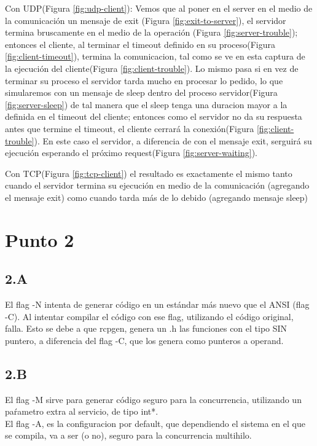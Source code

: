 \documentclass[12pt,journal,compsoc]{IEEEtran}
\begin{document}
Con UDP(Figura \ref{fig:udp-client}):
Vemos que al poner en el server en el medio de la comunicación un mensaje de exit (Figura \ref{fig:exit-to-server}), el servidor termina bruscamente en el medio de la operación (Figura \ref{fig:server-trouble}); entonces el cliente, al terminar el timeout definido en su proceso(Figura \ref{fig:client-timeout}), termina la comunicacion, tal como se ve en esta captura de la ejecución del cliente(Figura \ref{fig:client-trouble}).
Lo mismo pasa si en vez de terminar su proceso el servidor tarda mucho en procesar lo pedido, lo que simularemos con un mensaje de sleep dentro del proceso servidor(Figura \ref{fig:server-sleep}) de tal manera que el sleep tenga una duracion mayor a la definida en el timeout del cliente; entonces como el servidor no da su respuesta antes que termine el timeout, el cliente cerrará la conexión(Figura \ref{fig:client-trouble}). En este caso el servidor, a diferencia de con el mensaje exit, serguirá su ejecución esperando el próximo request(Figura \ref{fig:server-waiting}).

Con TCP(Figura \ref{fig:tcp-client}) el resultado es exactamente el mismo tanto cuando el servidor termina su ejecución en medio de la comunicación (agregando el mensaje exit) como cuando tarda más de lo debido (agregando mensaje sleep)

\section{Punto 2}
\subsection{2.A}
El flag -N intenta de generar código en un estándar más nuevo que el ANSI (flag -C).
Al intentar compilar el código con ese flag, utilizando el código original, falla.
Esto se debe a que rcpgen, genera un .h las funciones con el tipo SIN puntero, a diferencia del flag -C, que los genera como punteros a operand.

\subsection{2.B}
El flag -M sirve para generar código seguro para la concurrencia, utilizando un paŕametro extra al servicio, de tipo int*.\\
El flag -A, es la configuracion por default, que dependiendo el sistema en el que se compila, va a ser (o no), seguro para la concurrencia multihilo.
\end{document}
